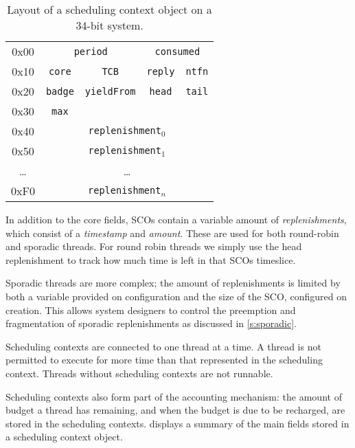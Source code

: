 \begin{table}[t] 
    \centering
    \begin{tabular}{c|c|c|c|c|}\cline{2-5}
        0x00 &  \multicolumn{2}{c}{\texttt{period}} & \multicolumn{2}{|c|}{\texttt{consumed}}
        \\\cline{2-5}
        0x10 & \texttt{core}                         & \texttt{TCB} & \texttt{reply} & \texttt{ntfn} \\\cline{2-5}
        0x20 &\texttt{badge}                        & \texttt{yieldFrom}                               & \texttt{head}  & \texttt{tail} \\\cline{2-5}
        0x30 & \texttt{max}                          &                                                  &                & \\\cline{2-5}
        0x40 & \multicolumn{4}{c|}{\texttt{replenishment$_{0}$}}  \\\cline{2-5}
        0x50 & \multicolumn{4}{c|}{\texttt{replenishment$_{1}$}}  \\\cline{2-5}
        \ldots & \multicolumn{4}{c|}{\ldots}  \\\cline{2-5}
        0xF0 & \multicolumn{4}{c|}{\texttt{replenishment$_{n}$}}  \\\cline{2-5}


    \end{tabular}
    \caption{Layout of a scheduling context object on a 34-bit system.}
    \label{t:impl-sc-layout}
\end{table}

In addition to the core fields, \glspl{SCO} contain a variable amount of
\emph{replenishments}, which consist of a \emph{timestamp} and \emph{amount}. These are used for
both round-robin and sporadic threads. For round robin threads we simply use the head replenishment to track how much time is left in that \glspl{SCO} timeslice. 

Sporadic threads are more complex; the amount of replenishments is limited by both a variable
provided on configuration and the size of the \gls{SCO}, configured on creation. This allows system
designers to control the preemption and fragmentation of sporadic replenishments as discussed in
\cref{s:sporadic}.


Scheduling contexts are connected to one thread at a time.  A thread is not permitted to execute for
more time than that represented in the scheduling context.  Threads without scheduling contexts are
not runnable.

Scheduling contexts also form part of the accounting mechanism: the amount of budget a thread has
remaining, and when the budget is due to be recharged, are stored in the scheduling contexts.
 displays a summary of the main fields stored in a scheduling context
object.

